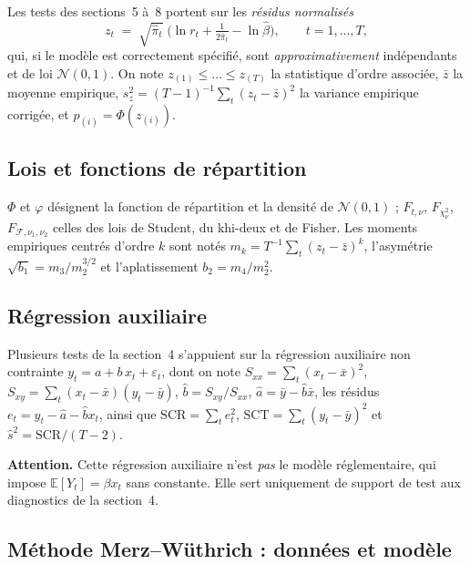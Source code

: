 \documentclass[a4paper,11pt]{article}
\begin{document}
Les tests des sections~5 à~8 portent sur les \emph{résidus normalisés}
\[
  z_t \;=\; \sqrt{\hat\pi_t}\;\Big(\ln r_t + \tfrac{1}{2\hat\pi_t} - \ln\hat\beta\Big),
  \qquad t = 1,\dots,T ,
\]
qui, si le modèle est correctement spécifié, sont \emph{approximativement} indépendants et de loi
$\mathcal{N}(0,1)$. On note $z_{(1)} \le \dots \le z_{(T)}$ la statistique d'ordre associée,
$\bar z$ la moyenne empirique, $s_z^2 = (T-1)^{-1}\sum_t (z_t - \bar z)^2$ la variance empirique
corrigée, et $p_{(i)} = \Phi(z_{(i)})$.

\subsection*{Lois et fonctions de répartition}

$\Phi$ et $\varphi$ désignent la fonction de répartition et la densité de $\mathcal{N}(0,1)$ ;
$F_{t,\nu}$, $F_{\chi^2_\nu}$, $F_{\mathcal{F},\nu_1,\nu_2}$ celles des lois de Student, du
khi-deux et de Fisher. Les moments empiriques centrés d'ordre $k$ sont notés
$m_k = T^{-1}\sum_t (z_t - \bar z)^k$, l'asymétrie $\sqrt{b_1} = m_3/m_2^{3/2}$ et
l'aplatissement $b_2 = m_4/m_2^{2}$.

\subsection*{Régression auxiliaire}

Plusieurs tests de la section~4 s'appuient sur la régression auxiliaire non contrainte
$y_t = a + b\,x_t + \varepsilon_t$, dont on note
$S_{xx} = \sum_t (x_t-\bar x)^2$, $S_{xy} = \sum_t (x_t-\bar x)(y_t-\bar y)$,
$\hat b = S_{xy}/S_{xx}$, $\hat a = \bar y - \hat b \bar x$, les résidus
$e_t = y_t - \hat a - \hat b x_t$, ainsi que
$\mathrm{SCR} = \sum_t e_t^2$, $\mathrm{SCT} = \sum_t (y_t - \bar y)^2$ et
$\hat s^2 = \mathrm{SCR}/(T-2)$.

\medskip
\begin{encadre}
\textbf{Attention.} Cette régression auxiliaire n'est \emph{pas} le modèle réglementaire, qui
impose $\mathbb{E}[Y_t] = \beta x_t$ sans constante. Elle sert uniquement de support de test aux
diagnostics de la section~4.
\end{encadre}

\subsection*{Méthode Merz--Wüthrich : données et modèle}
\label{sec:notations-mw}
\end{document}
